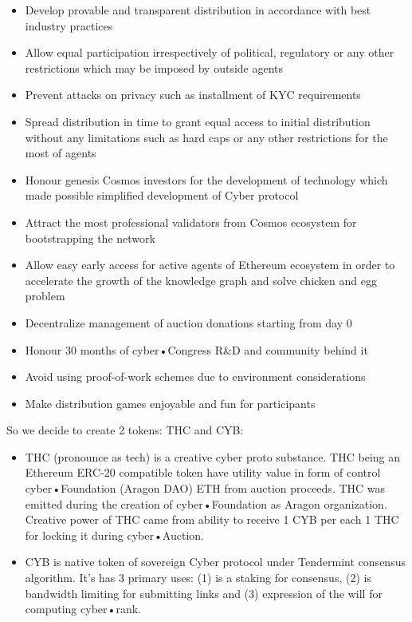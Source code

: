 \documentclass[8pt,oneside]{amsart}
\begin{document}
\begin{itemize}
\item Develop provable and transparent distribution in accordance with best industry practices
\item Allow equal participation irrespectively of political, regulatory or any other restrictions which may be imposed by outside agents
\item Prevent attacks on privacy such as installment of KYC requirements
\item Spread distribution in time to grant equal access to initial distribution without any limitations such as hard caps or any other restrictions for the most of agents
\item Honour genesis Cosmos investors for the development of technology which made possible simplified development of Cyber protocol
\item Attract the most professional validators from Cosmos ecosystem for bootstrapping the network
\item Allow easy early access for active agents of Ethereum ecosystem in order to accelerate the growth of the knowledge graph and solve chicken and egg problem
\item Decentralize management of auction donations starting from day 0
\item Honour 30 months of cyber•Congress R\&D and community behind it
\item Avoid using proof-of-work schemes due to environment considerations
\item Make distribution games enjoyable and fun for participants
\end{itemize}

So we decide to create 2 tokens: THC and CYB:

\begin{itemize}
\item THC (pronounce as tech) is a creative cyber proto substance. THC being an Ethereum ERC-20 compatible token have utility value in form of control cyber•Foundation (Aragon DAO) ETH from auction proceeds. THC was emitted during the creation of cyber•Foundation as Aragon organization. Creative power of THC came from ability to receive 1 CYB per each 1 THC for locking it during cyber•Auction.
\item CYB is native token of sovereign Cyber protocol under Tendermint consensus algorithm. It's has 3 primary uses: (1) is a staking for consensus, (2) is bandwidth limiting for submitting links and (3) expression of the will for computing cyber•rank.
\end{itemize}
\end{document}
